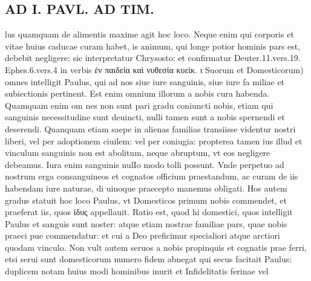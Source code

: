 \documentclass{article}
\begin{document}
\begin{pages}
\section*{AD I. PAVL. AD TIM. }
\marginpar{[ p.266 ]}\pstart lus quamquam de alimentis maxime agit hoc loco. Neque enim qui corporis et vitae huius caducae curam habet, is animum, qui longe potior hominis pars est, debebit negligere: sic interpretatur Chrysosto: et confirmatur Deuter.11.vers.19. Ephes.6.vers.4 in verbis ἐν παιδεία καὶ νυθεσία κυείκ. ι Suorum et Domesticorum) omnes intelligit Paulus, qui ad nos siue iure sanguinis, siue iure fa miliae et subiectionis pertinent. Est enim omnium illorum a nobis cura habenda. Quamquam enim om nes non sunt pari gradu coniuncti nobis, etiam qui sanguinis necessitudine sunt deuincti, nulli tamen sunt a nobis spernendi et deserendi. Quanquam etiam saepe in alienas familias transiisse videntur nostri liberi, vel per adoptionem ciuilem: vel per coniugia: propterea tamen ius illud et vinculum sanguinis non est abolitum, neque abruptum, vt eos negligere debeamus. Iura enim sanguinis nulIo modo tolli possunt. Vnde perpetuo ad nostrum erga consanguineos et cognatos officium praestandum, ac curam de iis habendam iure naturae, di uinoque praecepto manemus obligati. Hos autem gradus statuit hoc loco Paulus, vt Domesticos primum nobis commendet, et praeferat iis, quos ἰδυς appellauit. Ratio est, quod hi domestici, quos intelligit Paulus et sanguis sunt noster: atque etiam nostrae familiae pars, quae nobis praeci pue commendatur: et cui a Deo preficimur specialiori atque arctiori quodam vinculo. Non vult autem seruos a nobis propinquis et cognatis prae ferri, etsi serui sunt domesticorum numero fidem abnegat qui secus facitait Paulus: duplicem notam huius modi hominibus inurit et Infidelitatis ferinae vel  \pend

\end{pages}
\end{document}
